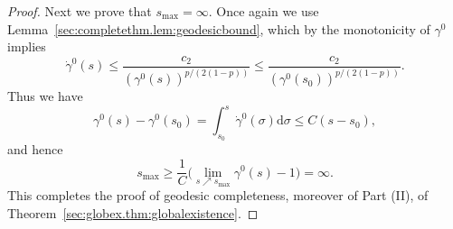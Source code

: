 \documentclass{article}
\newcommand{\de}{\mathrm{d}}
\begin{document}
\begin{proof}
    Next we prove that $s_{\max} = \infty$. Once again we use Lemma~\ref{sec:completethm.lem:geodesicbound}, which by the monotonicity of $\gamma^0$ implies
    \begin{equation}
        \dot{\gamma}^0(s) \leq \frac{c_2}{(\gamma^0(s))^{p/(2(1-p))}} \leq \frac{c_2}{(\gamma^0(s_0))^{p/(2(1-p))}}.
    \end{equation}
    Thus we have
    \begin{equation}
        \gamma^0(s) -\gamma^0(s_0) = \int_{s_0}^s \dot{\gamma}^0(\sigma)\de \sigma \leq C(s-s_0),
    \end{equation}
    and hence 
    \begin{equation}
        s_{\max} \geq \frac{1}{C}\big(\lim_{s \nearrow s_{\max}} \gamma^0(s) - 1\big) = \infty.
    \end{equation}
    This completes the proof of geodesic completeness, moreover of Part (II), of Theorem~\ref{sec:globex.thm:globalexistence}.
\end{proof}
\end{document}
